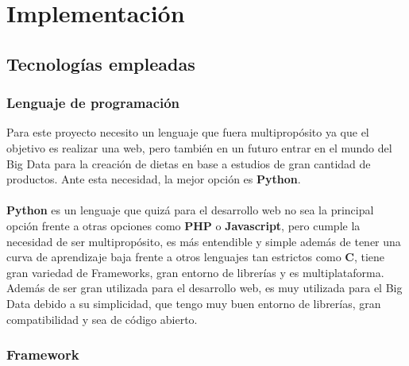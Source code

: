 \chapter{Implementación} \label{sec:implementacion}

\section{Tecnologías empleadas} \label{sec:tecnologias}

\subsection{Lenguaje de programación}

Para este proyecto necesito un lenguaje que fuera multipropósito ya que el objetivo es realizar una web, pero también en un futuro entrar en el mundo del Big Data para la creación de dietas en base a estudios de gran cantidad de productos.
Ante esta necesidad, la mejor opción es \textbf{Python}.\\\\
\textbf{Python} es un lenguaje que quizá para el desarrollo web no sea la principal opción frente a otras opciones como \textbf{PHP} o \textbf{Javascript}, pero cumple 
la necesidad de ser multipropósito, es más entendible y simple además de tener una curva de aprendizaje baja frente a otros lenguajes tan estrictos como \textbf{C}, 
tiene gran variedad de Frameworks, gran entorno de librerías y es multiplataforma.\\
Además de ser gran utilizada para el desarrollo web, es muy utilizada para el Big Data debido a su simplicidad, que tengo muy buen entorno de librerías, gran compatibilidad y sea de código abierto.

\subsection{Framework}

